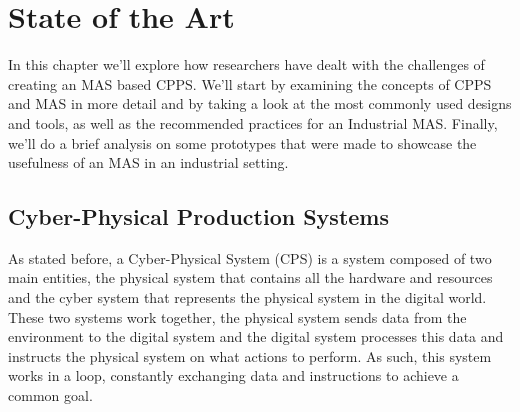 

\chapter{State of the Art}
\label{cha:state-of-the-art}

In this chapter we'll explore how researchers have dealt with the challenges of creating an MAS based CPPS. We'll start by  examining the concepts of CPPS and MAS in more detail and by taking a look at the most commonly used designs and tools, as well as the recommended practices for an Industrial MAS. Finally, we'll do a brief analysis on some prototypes that were made to showcase the usefulness of an MAS in an industrial setting.

\section{Cyber-Physical Production Systems}
\label{sec:cyber-physical_production_systems}

As stated before, a Cyber-Physical System (CPS) is a system composed of two main entities, the physical system that contains all the hardware and resources and the cyber system that represents the physical system in the digital world. These two systems work together, the physical system sends data from the environment to the digital system and the digital system processes this data and instructs the physical system on what actions to perform. As such, this system works in a loop, constantly exchanging data and instructions to achieve a common goal.\\


